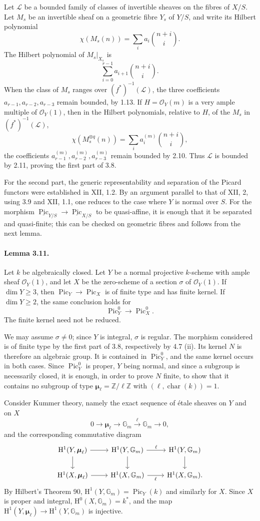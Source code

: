 \documentclass[12pt]{article}
\newcommand{\ZZ}{\mathbb Z}
\newcommand{\Gm}{\mathbb G_m}
\newcommand{\bmu}{\boldsymbol{\mu}}
\newcommand{\cO}{\mathcal O}
\newcommand{\cL}{\mathcal L}
\newcommand{\Pic}{\operatorname{Pic}}
\newcommand{\car}{\operatorname{char}}
\newcommand{\HH}{\mathrm H}
\newcommand{\longto}{\longrightarrow}
\begin{document}
Let $\cL$ be a bounded family of classes of invertible sheaves on the fibres of $X/S$. Let $M_s$ be an invertible sheaf on a geometric fibre $Y_s$ of $Y/S$, and write its Hilbert polynomial
\[
\chi(M_s(n))=\sum_i a_i\binom{n+i}{i}.
\]
The Hilbert polynomial of $M_s|_{X_s}$ is
\[
\sum_{i=0}^{r-1}a_{i+1}\binom{n+i}{i}.
\]
When the class of $M_s$ ranges over $(f^*)^{-1}(\cL)$, the three coefficients $a_{r-1},a_{r-2},a_{r-3}$ remain bounded, by 1.13. If $H=\cO_Y(m)$ is a very ample multiple of $\cO_Y(1)$, then in the Hilbert polynomials, relative to $H$, of the $M_s$ in $(f^*)^{-1}(\cL)$,
\[
\chi(M_s^{\otimes q}(n))=\sum_i a_i^{(m)}\binom{n+i}{i},
\]
the coefficients $a^{(m)}_{r-1},a^{(m)}_{r-2},a^{(m)}_{r-3}$ remain bounded by 2.10. Thus $\cL$ is bounded by 2.11, proving the first part of 3.8.

For the second part, the generic representability and separation of the Picard functors were established in XII, 1.2. By an argument parallel to that of XII, 2, using 3.9 and XII, 1.1, one reduces to the case where $Y$ is normal over $S$. For the morphism $\underline{\Pic}_{Y/S}\to \underline{\Pic}_{X/S}$ to be quasi-affine, it is enough that it be separated and quasi-finite; this can be checked on geometric fibres and follows from the next lemma.

\paragraph{Lemma 3.11.}
Let $k$ be algebraically closed. Let $Y$ be a normal projective $k$-scheme with ample sheaf $\cO_Y(1)$, and let $X$ be the zero-scheme of a section $\sigma$ of $\cO_Y(1)$. If $\dim Y\geq 3$, then $\Pic_Y\to \Pic_X$ is of finite type and has finite kernel. If $\dim Y\geq 2$, the same conclusion holds for
\[
\Pic^0_Y\longto \Pic^0_X.
\]
The finite kernel need not be reduced.

We may assume $\sigma\neq 0$; since $Y$ is integral, $\sigma$ is regular. The morphism considered is of finite type by the first part of 3.8, respectively by 4.7 (ii). Its kernel $N$ is therefore an algebraic group. It is contained in $\Pic^0_Y$, and the same kernel occurs in both cases. Since $\Pic^0_Y$ is proper, $Y$ being normal, and since a subgroup is necessarily closed, it is enough, in order to prove $N$ finite, to show that it contains no subgroup of type $\bmu_\ell=\ZZ/\ell\ZZ$ with $(\ell,\car(k))=1$.

Consider Kummer theory, namely the exact sequence of étale sheaves on $Y$ and on $X$
\[
0\longto \bmu_\ell\longto \Gm \xrightarrow{\ell}\Gm\longto 0,
\]
and the corresponding commutative diagram
\[
\begin{tikzcd}
\HH^1(Y,\bmu_\ell)\arrow[r]\arrow[d] &
\HH^1(Y,\Gm)\arrow[r,"\ell"]\arrow[d] &
\HH^1(Y,\Gm)\arrow[d]\\
\HH^1(X,\bmu_\ell)\arrow[r] &
\HH^1(X,\Gm)\arrow[r,"\ell"'] &
\HH^1(X,\Gm).
\end{tikzcd}
\]
By Hilbert's Theorem 90, $\HH^1(Y,\Gm)=\Pic_Y(k)$ and similarly for $X$. Since $X$ is proper and integral, $\HH^0(X,\Gm)=k^*$, and the map $\HH^1(Y,\bmu_\ell)\to\HH^1(Y,\Gm)$ is injective.
\end{document}
